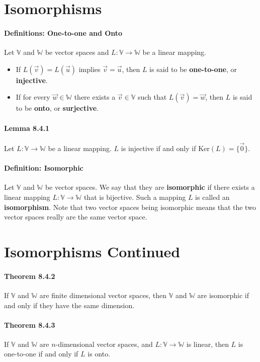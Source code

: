 \documentclass[10pt,letter]{article}
\begin{document}
\section*{Isomorphisms} 
\paragraph{Definitions: One-to-one and Onto} Let $\mathbb{V}$ and $\mathbb{W}$ be vector spaces and $L:\mathbb{V}\rightarrow\mathbb{W}$ be a linear mapping. 
\begin{itemize}
    \item If $L(\vec{v})=L(\vec{u})$ implies $\vec{v}=\vec{u}$, then $L$ is said to be \textbf{one-to-one}, or \textbf{injective}.
    \item If for every $\vec{w}\in\mathbb{W}$ there exists a $\vec{v}\in\mathbb{V}$ such that $L(\vec{v})=\vec{w}$, then $L$ is said to be \textbf{onto}, or \textbf{surjective}. 
\end{itemize}

\paragraph{Lemma 8.4.1} Let $L:\mathbb{V}\rightarrow\mathbb{W}$ be a linear mapping. $L$ is injective if and only if Ker$(L)=\{\vec{0}\}$. 

\paragraph{Definition: Isomorphic} Let $\mathbb{V}$ and $\mathbb{W}$ be vector spaces. We say that they are \textbf{isomorphic} if there exists a linear mapping $L:\mathbb{V}\rightarrow\mathbb{W}$ that is bijective. Such a mapping $L$ is called an \textbf{isomorphism}. Note that two vector spaces being isomorphic means that the two vector spaces really are the same vector space. 
\section*{Isomorphisms Continued} 
\paragraph{Theorem 8.4.2} If $\mathbb{V}$ and $\mathbb{W}$ are finite dimensional vector spaces, then $\mathbb{V}$ and $\mathbb{W}$ are isomorphic if and only if they have the same dimension. 

\paragraph{Theorem 8.4.3} If $\mathbb{V}$ and $\mathbb{W}$ are $n$-dimensional vector spaces, and $L:\mathbb{V}\rightarrow\mathbb{W}$ is linear, then $L$ is one-to-one if and only if $L$ is onto. 
\end{document}
